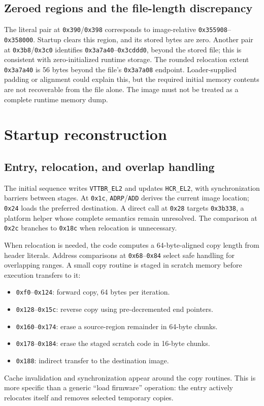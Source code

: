 \documentclass[11pt]{article}
\newcommand{\off}[1]{\texttt{0x#1}}
\begin{document}
\subsection{Zeroed regions and the file-length discrepancy}
The literal pair at \off{390}/\off{398} corresponds to image-relative
\off{355908}--\off{358000}. Startup clears this region, and its stored
bytes are zero. Another pair at \off{3b8}/\off{3c0} identifies
\off{3a7a40}--\off{3cddd0}, beyond the stored file; this is consistent with
zero-initialized runtime storage.
The rounded relocation extent \off{3a7a40} is 56 bytes beyond the file's
\off{3a7a08} endpoint. Loader-supplied padding or alignment could explain
this, but the required initial memory contents are not recoverable from the
file alone. The image must not be treated as a complete runtime memory dump.

\section{Startup reconstruction}
\subsection{Entry, relocation, and overlap handling}
The initial sequence writes \texttt{VTTBR\_EL2} and updates
\texttt{HCR\_EL2}, with synchronization barriers between stages.
At \off{1c}, \texttt{ADRP}/\texttt{ADD} derives the current image location;
\off{24} loads the preferred destination. A direct call at \off{28}
targets \off{3b338}, a platform helper whose complete semantics remain unresolved.
The comparison at \off{2c} branches to \off{18c} when relocation is unnecessary.

When relocation is needed, the code computes a 64-byte-aligned copy length
from header literals. Address comparisons at \off{68}--\off{84} select
safe handling for overlapping ranges. A small copy routine is staged in
scratch memory before execution transfers to it:
\begin{itemize}
\item \off{f0}--\off{124}: forward copy, 64 bytes per iteration.
\item \off{128}--\off{15c}: reverse copy using pre-decremented end pointers.
\item \off{160}--\off{174}: erase a source-region remainder in 64-byte chunks.
\item \off{178}--\off{184}: erase the staged scratch code in 16-byte chunks.
\item \off{188}: indirect transfer to the destination image.
\end{itemize}
Cache invalidation and synchronization appear around the copy routines.
This is more specific than a generic ``load firmware'' operation: the entry
actively relocates itself and removes selected temporary copies.
\end{document}
